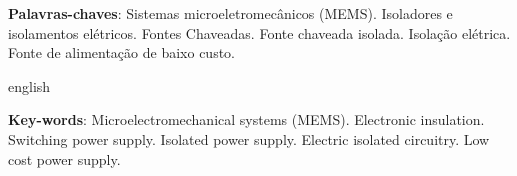 
\setlength{\absparsep}{18pt} %
\begin{resumo}
	
    \lipsum[7]
    
	\vspace{\onelineskip}
 
	\noindent 
	\textbf{Palavras-chaves}: Sistemas microeletromecânicos (MEMS). Isoladores e isolamentos elétricos. Fontes Chaveadas. Fonte chaveada isolada. Isolação elétrica. Fonte de alimentação de baixo custo.
\end{resumo}

\begin{resumo}[Abstract]
\begin{otherlanguage*}{english}
	\lipsum[8]
    
	\vspace{\onelineskip}
 
	\noindent 
	\textbf{Key-words}: Microelectromechanical systems (MEMS). Electronic insulation. Switching power supply. Isolated power supply. Electric isolated circuitry. Low cost power supply.
\end{otherlanguage*}
\end{resumo}

 

